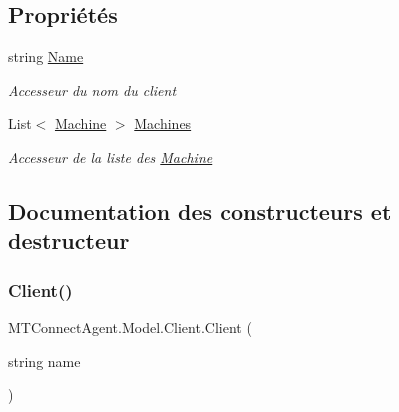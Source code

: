 \subsection*{Propriétés}
\begin{DoxyCompactItemize}
\item 
string \mbox{\hyperlink{class_m_t_connect_agent_1_1_model_1_1_client_ad3cab431fa147d3fbbd8ba015d6928bc}{Name}}
\begin{DoxyCompactList}\small\item\em Accesseur du nom du client \end{DoxyCompactList}\item 
List$<$ \mbox{\hyperlink{class_m_t_connect_agent_1_1_model_1_1_machine}{Machine}} $>$ \mbox{\hyperlink{class_m_t_connect_agent_1_1_model_1_1_client_a99571f570e22af5b1555ad37c2aa6d06}{Machines}}
\begin{DoxyCompactList}\small\item\em Accesseur de la liste des \mbox{\hyperlink{class_m_t_connect_agent_1_1_model_1_1_machine}{Machine}} \end{DoxyCompactList}\end{DoxyCompactItemize}


\subsection{Documentation des constructeurs et destructeur}
\mbox{\label{class_m_t_connect_agent_1_1_model_1_1_client_ad2d781a6f230ec83ccee4f7221a5a577}} 
\subsubsection{\texorpdfstring{Client()}{Client()}\hspace{0.1cm}{\footnotesize\ttfamily [1/2]}}
{\footnotesize\ttfamily M\+T\+Connect\+Agent.\+Model.\+Client.\+Client (\begin{DoxyParamCaption}\item[{string}]{name }\end{DoxyParamCaption})\hspace{0.3cm}{\ttfamily [inline]}}






